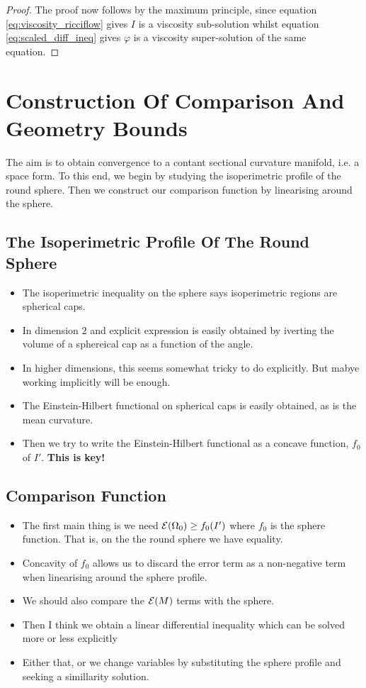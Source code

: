 \documentclass{amsart}
\begin{document}
\begin{proof}
The proof now follows by the maximum principle, since equation \eqref{eq:viscosity_ricciflow} gives \(I\) is a viscosity sub-solution whilst equation \eqref{eq:scaled_diff_ineq} gives \(\varphi\) is a viscosity super-solution of the same equation.
\end{proof}
\section{Construction Of Comparison And Geometry Bounds}

The aim is to obtain convergence to a contant sectional curvature manifold, i.e. a space form. To this end, we begin by studying the isoperimetric profile of the round sphere. Then we construct our comparison function by linearising around the sphere.

\subsection{The Isoperimetric Profile Of The Round Sphere}

\begin{itemize}
\item The isoperimetric inequality on the sphere says isoperimetric regions are spherical caps.
\item In dimension \(2\) and explicit expression is easily obtained by iverting the volume of a sphereical cap as a function of the angle.
\item In higher dimensions, this seems somewhat tricky to do explicitly. But mabye working implicitly will be enough.
\item The Einstein-Hilbert functional on spherical caps is easily obtained, as is the mean curvature.
\item Then we try to write the Einstein-Hilbert functional as a concave function, \(f_0\) of \(I'\). \textbf{This is key!}
\end{itemize}

\subsection{Comparison Function}

\begin{itemize}
\item The first main thing is we need \(\operatorname{\mathcal{E}}(\Omega_0) \geq f_0(I')\) where \(f_0\) is the sphere function. That is, on the the round sphere we have equality.
\item Concavity of \(f_0\) allows us to discard the error term as a non-negative term when linearising around the sphere profile.
\item We should also compare the \(\operatorname{\mathcal{E}}(M)\) terms with the sphere.
\item Then I think we obtain a linear differential inequality which can be solved more or less explicitly
\item Either that, or we change variables by substituting the sphere profile and seeking a simillarity solution.
\end{itemize}
\end{document}
